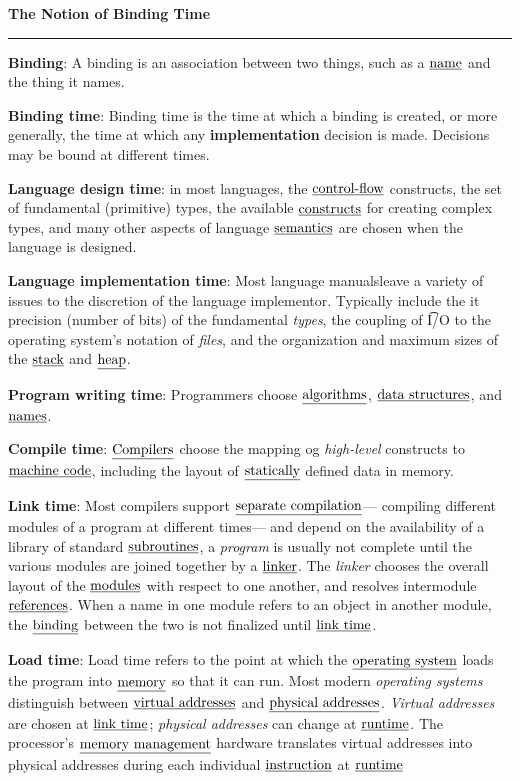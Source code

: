 \nopagenumbers
{\bf The Notion of Binding Time}
\vskip 1mm
\hrule

\vskip 6pt
{\bf Binding}: A binding is an association between two things, such as a $\underline{\hbox{name}}$ and the thing it names.

\vskip 6pt
{\bf Binding time}: Binding time is the time at which a binding is created, or more generally, the time at which any {\bf implementation} decision is made. Decisions may be bound at different times.

\vskip 6pt
{\bf Language design time}: in most languages, the $\underline{\hbox{control-flow}}$ constructs, the set of fundamental (primitive) types, the available $\underline{\hbox{constructs}}$ for creating complex types, and many other aspects of language $\underline{\hbox{semantics}}$ are chosen when the language is designed.

\vskip 6pt
{\bf Language implementation time}: Most language manualsleave a variety of issues to the discretion of the language implementor. Typically include the {it precision (number of bits)} of the fundamental {\it types}, the coupling of {\t I/O} to the operating system's notation of {\it files}, and the organization and maximum sizes of the $\underline{\hbox{stack}}$ and $\underline{\hbox{heap}}$.

\vskip 6pt
{\bf Program writing time}: Programmers choose $\underline{\hbox{algorithms}}$, $\underline{\hbox{data structures}}$, and $\underline{\hbox{names}}$.

\vskip 6pt
{\bf Compile time}: $\underline{\hbox{Compilers}}$ choose the mapping og {\it high-level} constructs to $\underline{\hbox{machine code}}$, including the layout of $\underline{\hbox{statically}}$ defined data in memory.

\vskip 6pt
{\bf Link time}: Most compilers support $\underline{\hbox{separate compilation}}$--- compiling different modules of a program at different times--- and depend on the availability of a library of standard $\underline{\hbox{subroutines}}$, a {\it program} is usually not complete until the various modules are joined together by a $\underline{\hbox{linker}}$. The {\it linker} chooses the overall layout of the $\underline{\hbox{modules}}$ with respect to one another, and resolves intermodule $\underline{\hbox{references}}$. When a name in one module refers to an object in another module, the $\underline{\hbox{binding}}$ between the two is not finalized until $\underline{\hbox{link time}}$.

\vskip 6pt
{\bf Load time}: Load time refers to the point at which the $\underline{\hbox{operating system}}$ loads the program into $\underline{\hbox{memory}}$ so that it can run. Most modern {\it operating systems} distinguish between $\underline{\hbox{virtual addresses}}$ and $\underline{\hbox{physical addresses}}$. {\it Virtual addresses} are chosen at $\underline{\hbox{link time}}$; {\it physical addresses} can change at $\underline{\hbox{runtime}}$. The processor's $\underline{\hbox{memory management}}$ hardware translates virtual addresses into physical addresses during each individual $\underline{\hbox{instruction}}$ at $\underline{\hbox{runtime}}$

